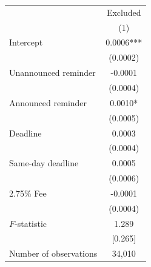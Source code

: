 \begin{tabular}[t]{lc}
\toprule
  & Excluded\\
& (1)\\
\midrule
Intercept & 0.0006***\\
 & (0.0002)\\
Unannounced reminder & -0.0001\\
 &  (0.0004)\\
Announced reminder & 0.0010*\\
 & (0.0005)\\
Deadline & 0.0003\\
 &  (0.0004)\\
Same-day deadline & 0.0005\\
 & (0.0006)\\
2.75\% Fee & -0.0001\\
 & (0.0004)\\
\midrule
$F$-statistic & 1.289\\
& [0.265]\\
Number of observations & 34,010\\
\bottomrule
\end{tabular}

